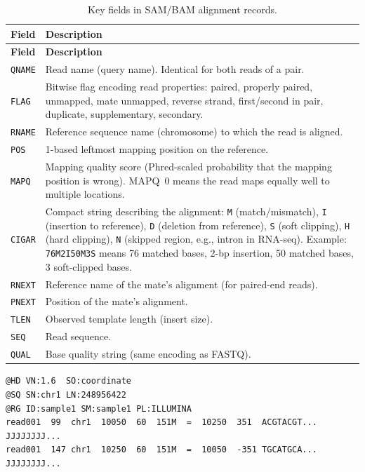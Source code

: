 \begin{longtable}{l p{10cm}}
\caption{Key fields in SAM/BAM alignment records.} \label{tab:sam-fields} \\
\toprule
\textbf{Field} & \textbf{Description} \\
\midrule
\endfirsthead
\toprule
\textbf{Field} & \textbf{Description} \\
\midrule
\endhead
\texttt{QNAME} & Read name (query name). Identical for both reads of a pair. \\
\texttt{FLAG} & Bitwise flag encoding read properties: paired, properly paired, unmapped, mate unmapped, reverse strand, first/second in pair, duplicate, supplementary, secondary. \\
\texttt{RNAME} & Reference sequence name (chromosome) to which the read is aligned. \\
\texttt{POS} & 1-based leftmost mapping position on the reference. \\
\texttt{MAPQ} & Mapping quality score (Phred-scaled probability that the mapping position is wrong). MAPQ~0 means the read maps equally well to multiple locations. \\
\texttt{CIGAR} & Compact string describing the alignment: \texttt{M} (match/mismatch), \texttt{I} (insertion to reference), \texttt{D} (deletion from reference), \texttt{S} (soft clipping), \texttt{H} (hard clipping), \texttt{N} (skipped region, e.g., intron in RNA-seq). Example: \texttt{76M2I50M3S} means 76 matched bases, 2-bp insertion, 50 matched bases, 3 soft-clipped bases. \\
\texttt{RNEXT} & Reference name of the mate's alignment (for paired-end reads). \\
\texttt{PNEXT} & Position of the mate's alignment. \\
\texttt{TLEN} & Observed template length (insert size). \\
\texttt{SEQ} & Read sequence. \\
\texttt{QUAL} & Base quality string (same encoding as FASTQ). \\
\bottomrule
\end{longtable}

\begin{lstlisting}[caption={SAM format example (two paired-end reads).},label=lst:sam]
@HD VN:1.6  SO:coordinate
@SQ SN:chr1 LN:248956422
@RG ID:sample1 SM:sample1 PL:ILLUMINA
read001  99  chr1  10050  60  151M  =  10250  351  ACGTACGT...  JJJJJJJJ...
read001  147 chr1  10250  60  151M  =  10050  -351 TGCATGCA...  JJJJJJJJ...
\end{lstlisting}

